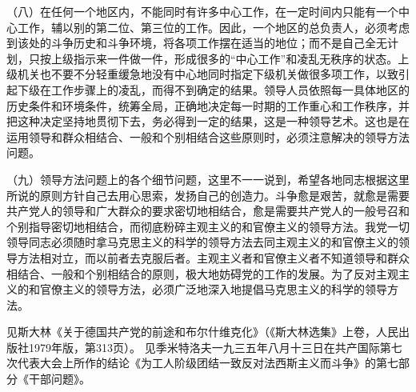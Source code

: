 （八）在任何一个地区内，不能同时有许多中心工作，在一定时间内只能有一个中心工作，辅以别的第二位、第三位的工作。因此，一个地区的总负责人，必须考虑到该处的斗争历史和斗争环境，将各项工作摆在适当的地位；而不是自己全无计划，只按上级指示来一件做一件，形成很多的“中心工作”和凌乱无秩序的状态。上级机关也不要不分轻重缓急地没有中心地同时指定下级机关做很多项工作，以致引起下级在工作步骤上的凌乱，而得不到确定的结果。领导人员依照每一具体地区的历史条件和环境条件，统筹全局，正确地决定每一时期的工作重心和工作秩序，并把这种决定坚持地贯彻下去，务必得到一定的结果，这是一种领导艺术。这也是在运用领导和群众相结合、一般和个别相结合这些原则时，必须注意解决的领导方法问题。

（九）领导方法问题上的各个细节问题，这里不一一说到，希望各地同志根据这里所说的原则方针自己去用心思索，发扬自己的创造力。斗争愈是艰苦，就愈是需要共产党人的领导和广大群众的要求密切地相结合，愈是需要共产党人的一般号召和个别指导密切地相结合，而彻底粉碎主观主义的和官僚主义的领导方法。我党一切领导同志必须随时拿马克思主义的科学的领导方法去同主观主义的和官僚主义的领导方法相对立，而以前者去克服后者。主观主义者和官僚主义者不知道领导和群众相结合、一般和个别相结合的原则，极大地妨碍党的工作的发展。为了反对主观主义的和官僚主义的领导方法，必须广泛地深入地提倡马克思主义的科学的领导方法。


\begin{maonote}
见斯大林《关于德国共产党的前途和布尔什维克化》（《斯大林选集》上卷，人民出版社1979年版，第313页）。
见季米特洛夫一九三五年八月十三日在共产国际第七次代表大会上所作的结论《为工人阶级团结一致反对法西斯主义而斗争》的第七部分《干部问题》。
\end{maonote}
